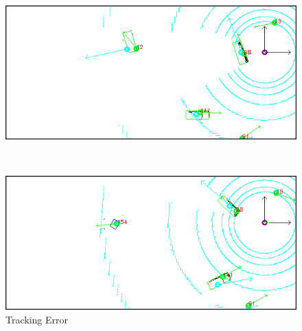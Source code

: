 \documentclass[11pt,oneside,openright]{mpreport}
\begin{document}
\begin{figure}[htb]
  \caption{Tracking Error} 
    \centering
    \begin{minipage}[t]{\textwidth}
        \centering
        \includegraphics[width=\textwidth]{bilder/alg/lost.png}
    \end{minipage}%
    \\
    \begin{minipage}[t]{\textwidth}
        \centering
	\includegraphics[width=\textwidth]{bilder/alg/redetect.png}
    \end{minipage}
    \label{lost}
\end{figure}

\end{document}
